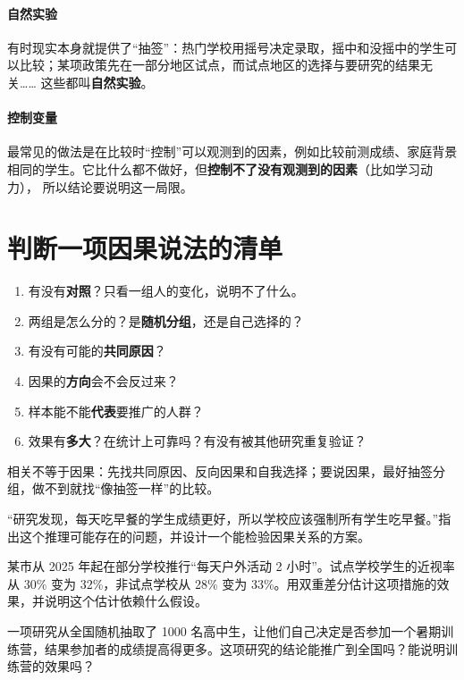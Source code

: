 \paragraph{自然实验}
有时现实本身就提供了“抽签”：热门学校用摇号决定录取，摇中和没摇中的学生可以比较；某项政策先在一部分地区试点，而试点地区的选择与要研究的结果无关……
这些都叫\textbf{自然实验}。

\paragraph{控制变量}
最常见的做法是在比较时“控制”可以观测到的因素，例如比较前测成绩、家庭背景相同的学生。它比什么都不做好，但\textbf{控制不了没有观测到的因素}（比如学习动力），
所以结论要说明这一局限。

\section{判断一项因果说法的清单}

\begin{enumerate}
  \item 有没有\textbf{对照}？只看一组人的变化，说明不了什么。
  \item 两组是怎么分的？是\textbf{随机分组}，还是自己选择的？
  \item 有没有可能的\textbf{共同原因}？
  \item 因果的\textbf{方向}会不会反过来？
  \item 样本能不能\textbf{代表}要推广的人群？
  \item 效果有\textbf{多大}？在统计上可靠吗？有没有被其他研究重复验证？
\end{enumerate}

\begin{oneline}
相关不等于因果：先找共同原因、反向因果和自我选择；要说因果，最好抽签分组，做不到就找“像抽签一样”的比较。
\end{oneline}

\begin{exercises}[练一练]
  \item “研究发现，每天吃早餐的学生成绩更好，所以学校应该强制所有学生吃早餐。”指出这个推理可能存在的问题，并设计一个能检验因果关系的方案。
  \item 某市从 2025 年起在部分学校推行“每天户外活动 2 小时”。试点学校学生的近视率从 30\% 变为 32\%，非试点学校从 28\% 变为 33\%。用双重差分估计这项措施的效果，并说明这个估计依赖什么假设。
  \item 一项研究从全国随机抽取了 1000 名高中生，让他们自己决定是否参加一个暑期训练营，结果参加者的成绩提高得更多。这项研究的结论能推广到全国吗？能说明训练营的效果吗？
\end{exercises}
